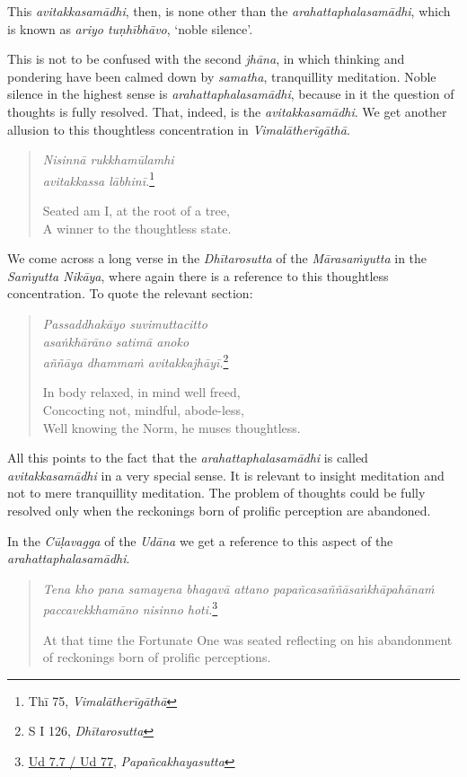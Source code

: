 This \emph{avitakkasamādhi}, then, is none other than the \emph{arahattaphalasamādhi}, which is known as \emph{ariyo tuṇhībhāvo}, `noble silence'.

This is not to be confused with the second \emph{jhāna}, in which thinking and pondering have been calmed down by \emph{samatha}, tranquillity meditation. Noble silence in the highest sense is \emph{arahattaphalasamādhi}, because in it the question of thoughts is fully resolved. That, indeed, is the \emph{avitakkasamādhi}. We get another allusion to this thoughtless concentration in \emph{Vimalātherīgāthā}.

\begin{quote}
\emph{Nisinnā rukkhamūlamhi}\\
\emph{avitakkassa lābhinī.}\footnote{Thī 75, \emph{Vimalātherīgāthā}}

Seated am I, at the root of a tree,\\
A winner to the thoughtless state.
\end{quote}

We come across a long verse in the \emph{Dhītarosutta} of the \emph{Mārasaṁyutta} in the \emph{Saṁyutta Nikāya}, where again there is a reference to this thoughtless concentration. To quote the relevant section:

\begin{quote}
\emph{Passaddhakāyo suvimuttacitto}\\
\emph{asaṅkhārāno satimā anoko}\\
\emph{aññāya dhammaṁ avitakkajhāyī.}\footnote{S I 126, \emph{Dhītarosutta}}

In body relaxed, in mind well freed,\\
Concocting not, mindful, abode-less,\\
Well knowing the Norm, he muses thoughtless.
\end{quote}

All this points to the fact that the \emph{arahattaphalasamādhi} is called \emph{avitakkasamādhi} in a very special sense. It is relevant to insight meditation and not to mere tranquillity meditation. The problem of thoughts could be fully resolved only when the reckonings born of prolific perception are abandoned.

In the \emph{Cūḷavagga} of the \emph{Udāna} we get a reference to this aspect of the \emph{arahattaphalasamādhi}.

\begin{quote}
\emph{Tena kho pana samayena bhagavā attano papañcasaññāsaṅkhāpahānaṁ paccavekkhamāno nisinno hoti.}\footnote{\href{https://suttacentral.net/ud7.7/pli/ms}{Ud 7.7 / Ud 77}, \emph{Papañcakhayasutta}}

At that time the Fortunate One was seated reflecting on his abandonment of reckonings born of prolific perceptions.
\end{quote}

